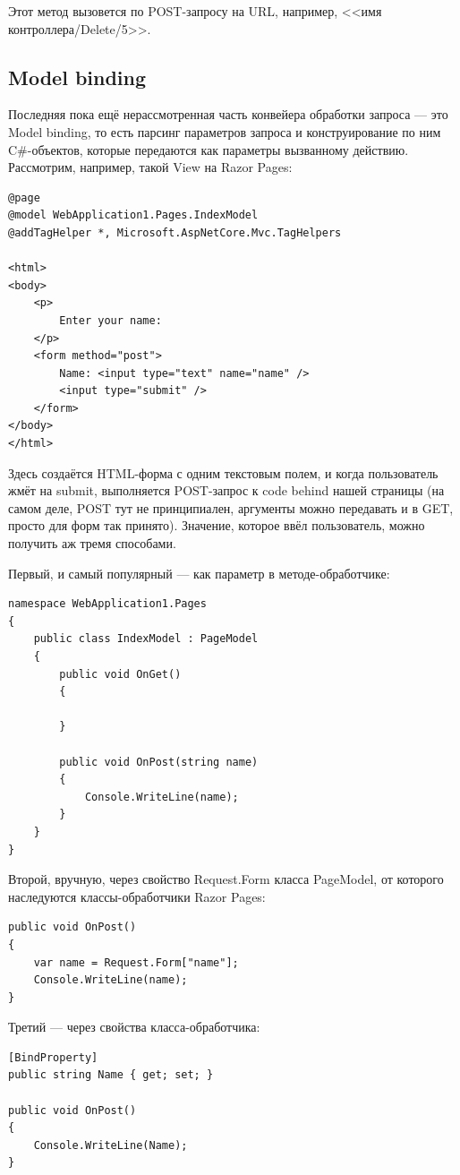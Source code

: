 \documentclass[a5paper]{article}
\begin{document}
Этот метод вызовется по POST-запросу на URL, например, <<имя контроллера/Delete/5>>.

\subsection{Model binding}

Последняя пока ещё нерассмотренная часть конвейера обработки запроса --- это Model binding, то есть парсинг параметров запроса и конструирование по ним C\#-объектов, которые передаются как параметры вызванному действию. Рассмотрим, например, такой View на Razor Pages:

\begin{verbatim}
@page
@model WebApplication1.Pages.IndexModel
@addTagHelper *, Microsoft.AspNetCore.Mvc.TagHelpers

<html>
<body>
    <p>
        Enter your name:
    </p>
    <form method="post">
        Name: <input type="text" name="name" />
        <input type="submit" />
    </form>
</body>
</html>
\end{verbatim}

Здесь создаётся HTML-форма с одним текстовым полем, и когда пользователь жмёт на submit, выполняется POST-запрос к code behind нашей страницы (на самом деле, POST тут не принципиален, аргументы можно передавать и в GET, просто для форм так принято). Значение, которое ввёл пользователь, можно получить аж тремя способами.

Первый, и самый популярный --- как параметр в методе-обработчике:

\begin{verbatim}
namespace WebApplication1.Pages
{
    public class IndexModel : PageModel
    {
        public void OnGet()
        {

        }

        public void OnPost(string name)
        {
            Console.WriteLine(name);
        }
    }
}
\end{verbatim}

Второй, вручную, через свойство Request.Form класса PageModel, от которого наследуются классы-обработчики Razor Pages:

\begin{verbatim}
public void OnPost()
{
    var name = Request.Form["name"];
    Console.WriteLine(name);
}
\end{verbatim}

Третий --- через свойства класса-обработчика:

\begin{verbatim}
[BindProperty]
public string Name { get; set; }

public void OnPost()
{
    Console.WriteLine(Name);
}
\end{verbatim}
\end{document}

